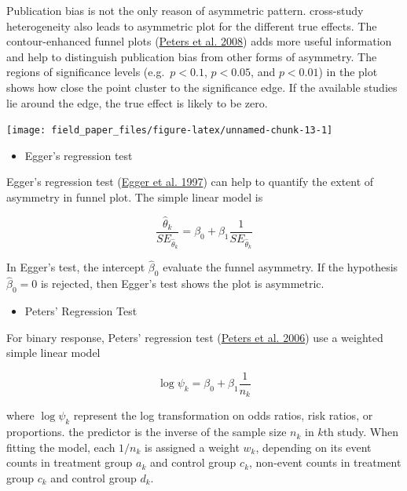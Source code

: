 \documentclass[
  11pt,
  openany]{memoir}
\providecommand{\tightlist}{%
  \setlength{\itemsep}{0pt}\setlength{\parskip}{0pt}}
\begin{document}
Publication bias is not the only reason of asymmetric pattern. cross-study heterogeneity also leads to asymmetric plot for the different true effects.
The contour-enhanced funnel plots (\protect\hyperlink{ref-petersContourenhancedMetaanalysisFunnel2008}{Peters et al. 2008}) adds more useful information and help to distinguish publication bias from other forms of asymmetry.
The regions of significance levels (e.g.~\(p< 0.1\), \(p< 0.05\), and \(p< 0.01\)) in the plot shows how close the point cluster to the significance edge.
If the available studies lie around the edge, the true effect is likely to be zero.

\begin{center}\texttt{[image: field\_paper\_files/figure-latex/unnamed-chunk-13-1]} \end{center}

\begin{itemize}
\tightlist
\item
  Egger's regression test
\end{itemize}

Egger's regression test (\protect\hyperlink{ref-eggerBiasMetaanalysisDetected1997}{Egger et al. 1997}) can help to quantify the extent of asymmetry in funnel plot. The simple linear model is

\begin{equation}
\frac{\hat\theta_k}{SE_{\hat\theta_k}} = \beta_0 + \beta_1 \frac{1}{SE_{\hat\theta_k}}
\end{equation}

In Egger's test, the intercept \(\hat\beta_0\) evaluate the funnel asymmetry. If the hypothesis \(\hat\beta_0=0\)
is rejected, then Egger's test shows the plot is asymmetric.

\begin{itemize}
\tightlist
\item
  Peters' Regression Test
\end{itemize}

For binary response, Peters' regression test (\protect\hyperlink{ref-petersComparisonTwoMethods2006}{Peters et al. 2006}) use a weighted simple linear model

\begin{equation}
\log\psi_k =  \beta_0 + \beta_1\frac{1}{n_k}
\end{equation}

where \(\log\psi_k\) represent the log transformation on odds ratios, risk ratios, or proportions.
the predictor is the inverse of the sample size \(n_k\) in \(k\)th study.
When fitting the model, each \(1/n_k\) is assigned a weight \(w_k\), depending on its event counts in treatment group \(a_k\) and control group \(c_k\), non-event counts in treatment group \(c_k\) and control group \(d_k\).
\end{document}
